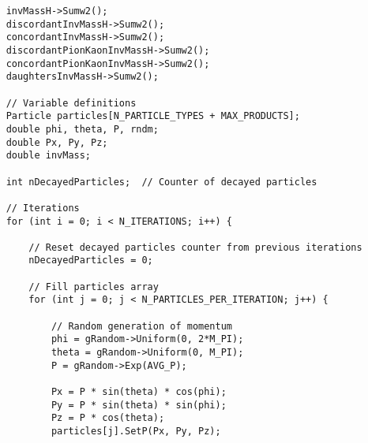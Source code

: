 \documentclass{article}
\begin{document}
\begin{verbatim}
    invMassH->Sumw2();
    discordantInvMassH->Sumw2();
    concordantInvMassH->Sumw2();
    discordantPionKaonInvMassH->Sumw2();
    concordantPionKaonInvMassH->Sumw2();
    daughtersInvMassH->Sumw2();

    // Variable definitions
    Particle particles[N_PARTICLE_TYPES + MAX_PRODUCTS];
    double phi, theta, P, rndm;
    double Px, Py, Pz;
    double invMass;

    int nDecayedParticles;  // Counter of decayed particles

    // Iterations
    for (int i = 0; i < N_ITERATIONS; i++) {

        // Reset decayed particles counter from previous iterations
        nDecayedParticles = 0;

        // Fill particles array
        for (int j = 0; j < N_PARTICLES_PER_ITERATION; j++) {

            // Random generation of momentum
            phi = gRandom->Uniform(0, 2*M_PI);
            theta = gRandom->Uniform(0, M_PI);
            P = gRandom->Exp(AVG_P);

            Px = P * sin(theta) * cos(phi);
            Py = P * sin(theta) * sin(phi);
            Pz = P * cos(theta);
            particles[j].SetP(Px, Py, Pz);


\end{verbatim}
\end{document}
